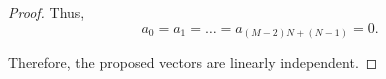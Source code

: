 \documentclass[10pt,a4paper]{amsart}
\begin{document}
\begin{proof}
Thus,
\[
a_0
=
a_1
=
\dots
=
a_{(M-2)N+(N-1)}
=
0.
\]

Therefore, the proposed vectors are linearly independent.
\end{proof}
\end{document}
